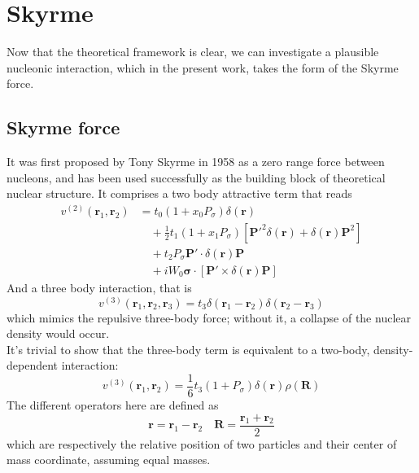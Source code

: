 \section{Skyrme}
\label{sec:skyrme}
Now that the theoretical framework is clear, we can investigate a plausible nucleonic interaction, which in the present work, takes the form of the Skyrme force.
\subsection{Skyrme force}
It was first proposed by Tony Skyrme in 1958 \cite{SKYRME1958615} as a zero range force between nucleons, and has been used successfully as the building block of theoretical nuclear structure.
It comprises a two body attractive term that reads
\begin{align*}
v^{(2)}(\mathbf{r}_1, \mathbf{r}_2) &= t_0 \left(1 + x_0 P_\sigma \right) \delta(\mathbf{r}) \\
&\quad + \frac{1}{2} t_1 \left(1 + x_1 P_\sigma \right) \left[ \mathbf{P}'^2 \delta(\mathbf{r}) + \delta(\mathbf{r}) \mathbf{P}^2 \right] \\
&\quad + t_2 P_\sigma  \mathbf{P}' \cdot \delta(\mathbf{r}) \mathbf{P} \\
&\quad + i W_0 \boldsymbol{\sigma}\cdot \left[ \mathbf{P}' \times \delta(\mathbf{r}) \mathbf{P} \right]
\end{align*}
And a three body interaction, that is
\begin{equation*}
    v^{(3)}(\bm r_1, \bm r_2, \bm r_3) = t_3\delta(\bm r_1-\bm r_2)\delta(\bm r_2 -\bm r_3)
\end{equation*}
which mimics the repulsive three-body force; without it, a collapse of the nuclear density would occur.
\\It's trivial to show that the three-body term is equivalent to a two-body, density-dependent interaction: \cite{VauhBrinkOriginal}
\begin{equation}
v^{(3)}(\bm r_1, \bm r_2) = \frac 1 6 t_3 (1+P_\sigma)  \delta(\bm r )\rho(\bm R)
\end{equation}
The different operators here are defined as
\begin{equation}
\mathbf{r} = \mathbf{r}_1 - \mathbf{r}_2\quad \mathbf{R} = \frac{\mathbf{r}_1+\mathbf{r}_2}{2}
\end{equation}
which are respectively the relative position of two particles and their center of mass coordinate, assuming equal masses.
